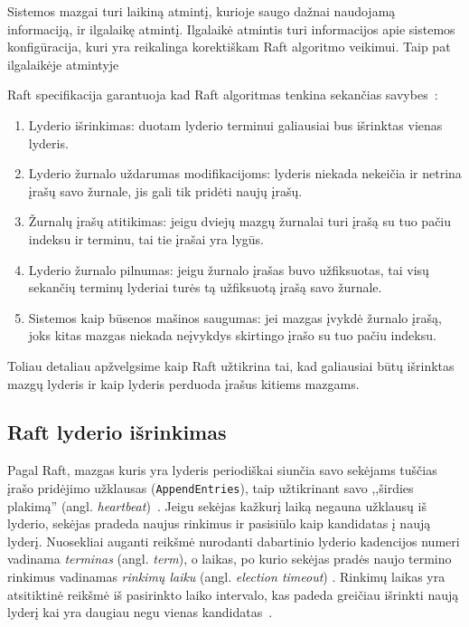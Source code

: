 \documentclass{VUMIFPSkursinis}
\begin{document}
Sistemos mazgai turi laikiną atmintį, kurioje saugo dažnai naudojamą informaciją, ir ilgalaikę atmintį. Ilgalaikė atmintis turi informacijos apie sistemos konfigūracija, kuri yra reikalinga korektiškam Raft algoritmo veikimui. Taip pat ilgalaikėje atmintyje 

Raft specifikacija garantuoja kad Raft algoritmas tenkina sekančias savybes~\cite{ongaro_consensus}: 

\begin{enumerate}
\item Lyderio išrinkimas: duotam lyderio terminui galiausiai bus išrinktas vienas lyderis.
\item Lyderio žurnalo uždarumas modifikacijoms: lyderis niekada nekeičia ir netrina įrašų savo žurnale, jis gali tik pridėti naujų įrašų.
\item Žurnalų įrašų atitikimas: jeigu dviejų mazgų žurnalai turi įrašą su tuo pačiu indeksu ir terminu, tai tie įrašai yra lygūs.
\item Lyderio žurnalo pilnumas: jeigu žurnalo įrašas buvo užfiksuotas, tai visų sekančių terminų lyderiai turės tą užfiksuotą įrašą savo žurnale.
\item Sistemos kaip būsenos mašinos saugumas: jei mazgas įvykdė žurnalo įrašą, joks kitas mazgas niekada neįvykdys skirtingo įrašo su tuo pačiu indeksu.
\end{enumerate}

Toliau detaliau apžvelgsime kaip Raft užtikrina tai, kad galiausiai būtų išrinktas mazgų lyderis ir kaip lyderis perduoda įrašus kitiems mazgams.

\subsection{Raft lyderio išrinkimas}

Pagal Raft, mazgas kuris yra lyderis periodiškai siunčia savo sekėjams tuščias įrašo pridėjimo užklausas (\texttt{AppendEntries}), taip užtikrinant savo ,,širdies plakimą'' (angl. \textit{heartbeat})~\cite{ongaro_consensus}. Jeigu sekėjas kažkurį laiką negauna užklausų iš lyderio, sekėjas pradeda naujus rinkimus ir pasisiūlo kaip kandidatas į naują lyderį. Nuosekliai auganti reikšmė nurodanti dabartinio lyderio kadencijos numeri vadinama \textit{terminas} (angl. \emph{term}), o laikas, po kurio sekėjas pradės naujo termino rinkimus vadinamas \textit{rinkimų laiku} (angl. \textit{election timeout}) . Rinkimų laikas yra atsitiktinė reikšmė iš pasirinkto laiko intervalo, kas padeda greičiau išrinkti naują lyderį kai yra daugiau negu vienas kandidatas~\cite{ongaro_consensus}.
\end{document}
